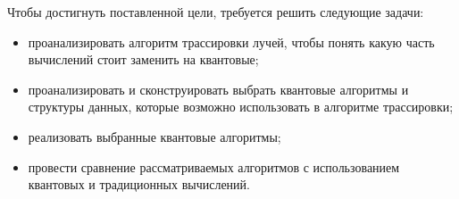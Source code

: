 Чтобы достигнуть поставленной цели, требуется решить следующие задачи:

\begin{itemize}
    \item проанализировать алгоритм трассировки лучей, чтобы понять какую часть вычислений стоит заменить на квантовые;
    \item проанализировать и сконструировать выбрать квантовые алгоритмы и структуры данных, которые возможно использовать в алгоритме трассировки;
    \item реализовать выбранные квантовые алгоритмы;
    \item провести сравнение рассматриваемых алгоритмов с использованием квантовых и традиционных вычислений.
\end{itemize}
